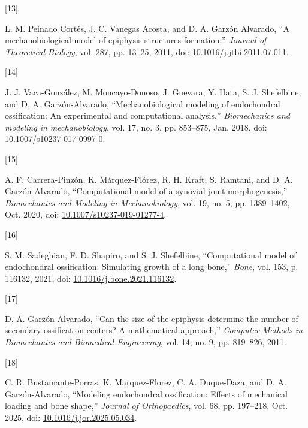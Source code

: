 \documentclass[
  letterpaper,
  DIV=11,
  numbers=noendperiod]{scrartcl}
\newlength{\cslhangindent}
\newlength{\csllabelwidth}
\newenvironment{CSLReferences}[2] %
 {\begin{list}{}{%
  \setlength{\itemindent}{0pt}
  \setlength{\leftmargin}{0pt}
  \setlength{\parsep}{0pt}
  \ifodd #1
   \setlength{\leftmargin}{\cslhangindent}
   \setlength{\itemindent}{-1\cslhangindent}
  \fi
  \setlength{\itemsep}{#2\baselineskip}}}
 {\end{list}}
\newcommand{\CSLLeftMargin}[1]{\parbox[t]{\csllabelwidth}{\strut#1\strut}}
\newcommand{\CSLRightInline}[1]{\parbox[t]{\linewidth - \csllabelwidth}{\strut#1\strut}}
\begin{document}
\begin{CSLReferences}{0}{0}
\CSLLeftMargin{{[}13{]} }%
\CSLRightInline{L. M. Peinado Cortés, J. C. Vanegas Acosta, and D. A.
Garzón Alvarado, {``A mechanobiological model of epiphysis structures
formation,''} \emph{Journal of Theoretical Biology}, vol. 287, pp.
13--25, 2011, doi:
\href{https://doi.org/10.1016/j.jtbi.2011.07.011}{10.1016/j.jtbi.2011.07.011}.}

\CSLLeftMargin{{[}14{]} }%
\CSLRightInline{J. J. Vaca-González, M. Moncayo-Donoso, J. Guevara, Y.
Hata, S. J. Shefelbine, and D. A. Garzón-Alvarado, {``Mechanobiological
modeling of endochondral ossification: An experimental and computational
analysis,''} \emph{Biomechanics and modeling in mechanobiology}, vol.
17, no. 3, pp. 853--875, Jan. 2018, doi:
\href{https://doi.org/10.1007/s10237-017-0997-0}{10.1007/s10237-017-0997-0}.}

\CSLLeftMargin{{[}15{]} }%
\CSLRightInline{A. F. Carrera-Pinzón, K. Márquez-Flórez, R. H. Kraft, S.
Ramtani, and D. A. Garzón-Alvarado, {``Computational model of a synovial
joint morphogenesis,''} \emph{Biomechanics and Modeling in
Mechanobiology}, vol. 19, no. 5, pp. 1389--1402, Oct. 2020, doi:
\href{https://doi.org/10.1007/s10237-019-01277-4}{10.1007/s10237-019-01277-4}.}

\CSLLeftMargin{{[}16{]} }%
\CSLRightInline{S. M. Sadeghian, F. D. Shapiro, and S. J. Shefelbine,
{``Computational model of endochondral ossification: {Simulating} growth
of a long bone,''} \emph{Bone}, vol. 153, p. 116132, 2021, doi:
\href{https://doi.org/10.1016/j.bone.2021.116132}{10.1016/j.bone.2021.116132}.}

\CSLLeftMargin{{[}17{]} }%
\CSLRightInline{D. A. Garzón-Alvarado, {``Can the size of the epiphysis
determine the number of secondary ossification centers? {A} mathematical
approach,''} \emph{Computer Methods in Biomechanics and Biomedical
Engineering}, vol. 14, no. 9, pp. 819--826, 2011.}

\CSLLeftMargin{{[}18{]} }%
\CSLRightInline{C. R. Bustamante-Porras, K. Marquez-Florez, C. A.
Duque-Daza, and D. A. Garzón-Alvarado, {``Modeling endochondral
ossification: {Effects} of mechanical loading and bone shape,''}
\emph{Journal of Orthopaedics}, vol. 68, pp. 197--218, Oct. 2025, doi:
\href{https://doi.org/10.1016/j.jor.2025.05.034}{10.1016/j.jor.2025.05.034}.}

\end{CSLReferences}
\end{document}
